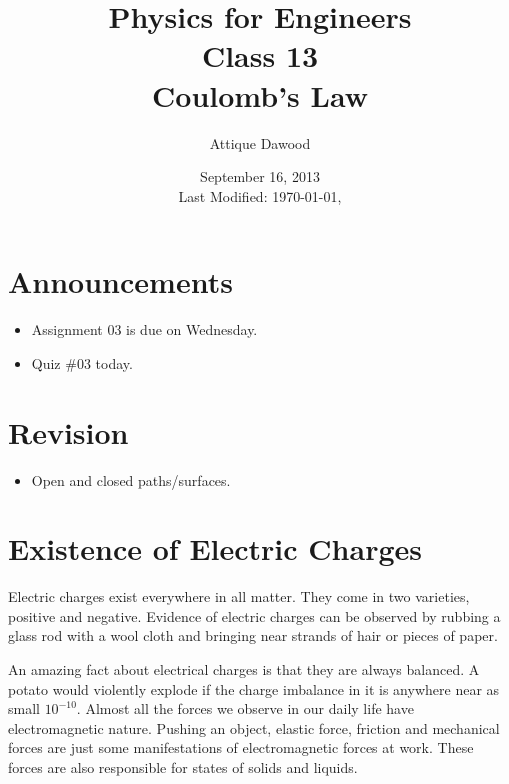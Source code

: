 \documentclass[12pt,a4paper]{article}
\title{\vspace{-2cm}Physics for Engineers\\Class 13\\Coulomb's Law}
\author{Attique Dawood}
\date{September 16, 2013\\[0.2cm] Last Modified: \today, \currenttime}
\begin{document}
\maketitle
\section{Announcements}
\begin{itemize}
\item Assignment 03 is due on Wednesday.
\item Quiz \#03 today.
\end{itemize}
\section{Revision}
\begin{itemize}
\item Open and closed paths/surfaces.
\end{itemize}
\section{Existence of Electric Charges}
Electric charges exist everywhere in all matter. They come in two varieties, positive and negative. Evidence of electric charges can be observed by rubbing a glass rod with a wool cloth and bringing near strands of hair or pieces of paper.

An amazing fact about electrical charges is that they are always balanced. A potato would violently explode if the charge imbalance in it is anywhere near as small $10^{-10}$. Almost all the forces we observe in our daily life have electromagnetic nature. Pushing an object, elastic force, friction and mechanical forces are just some manifestations of electromagnetic forces at work. These forces are also responsible for states of solids and liquids.
\end{document}
